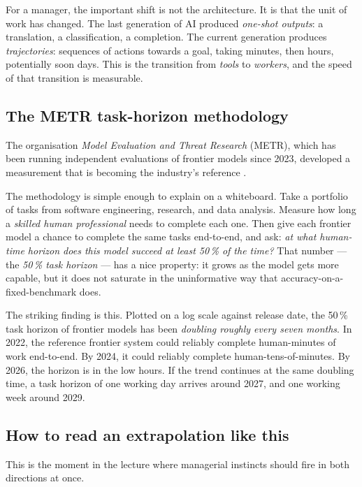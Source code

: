 \documentclass[11pt,a4paper]{article}
\begin{document}
For a manager, the important shift is not the architecture. It is
that the unit of work has changed. The last generation of AI produced
\emph{one-shot outputs}: a translation, a classification, a
completion. The current generation produces \emph{trajectories}:
sequences of actions towards a goal, taking minutes, then hours,
potentially soon days. This is the transition from \emph{tools} to
\emph{workers}, and the speed of that transition is measurable.

\subsection{The METR task-horizon methodology}

The organisation \emph{Model Evaluation and Threat Research} (METR),
which has been running independent evaluations of frontier models
since 2023, developed a measurement that is becoming the industry's
reference \citep{metr2024horizon}.

The methodology is simple enough to explain on a whiteboard. Take a
portfolio of tasks from software engineering, research, and data
analysis. Measure how long a \emph{skilled human professional} needs
to complete each one. Then give each frontier model a chance to
complete the same tasks end-to-end, and ask: \emph{at what human-time
horizon does this model succeed at least 50\,\% of the time?} That
number --- the \emph{50\,\% task horizon} --- has a nice property:
it grows as the model gets more capable, but it does not saturate in
the uninformative way that accuracy-on-a-fixed-benchmark does.

The striking finding is this. Plotted on a log scale against release
date, the 50\,\% task horizon of frontier models has been \emph{doubling
roughly every seven months}. In 2022, the reference frontier system
could reliably complete human-minutes of work end-to-end. By 2024, it
could reliably complete human-tens-of-minutes. By 2026, the horizon is
in the low hours. If the trend continues at the same doubling time, a
task horizon of one working day arrives around 2027, and one working
week around 2029.

\subsection{How to read an extrapolation like this}

This is the moment in the lecture where managerial instincts should
fire in both directions at once.
\end{document}
